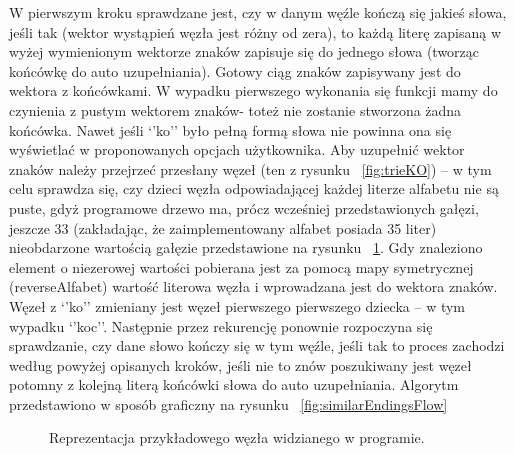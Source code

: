 \documentclass[twoside,a4paper]{book}
\begin{document}
W pierwszym kroku sprawdzane jest, czy w danym węźle kończą się  jakieś słowa, jeśli tak (wektor wystąpień węzła jest różny od zera), to każdą literę zapisaną w wyżej wymienionym wektorze znaków zapisuje się do jednego słowa (tworząc końcówkę do auto uzupełniania). Gotowy ciąg znaków zapisywany jest do wektora z końcówkami. W wypadku pierwszego wykonania się funkcji mamy do czynienia z pustym wektorem znaków- toteż nie zostanie stwo\-rzo\-na żadna końcówka. Nawet jeśli  ‘’ko’’ było pełną formą słowa nie powinna ona się wyświetlać w proponowanych opcjach użytkownika. Aby uzupełnić we\-ktor znaków należy przejrzeć przesłany węzeł (ten z rysunku ~\ref{fig:trieKO}) – w tym celu sprawdza się, czy dzieci węzła odpowiadającej każdej literze alfabetu nie są puste, gdyż programowe drzewo ma, prócz wcześniej przedstawionych gałęzi, jeszcze 33 (zakładając, że zaimplementowany alfabet posiada 35 liter) nieobdarzone wartością gałęzie przedstawione na rysunku ~\ref{fig:trieKOnull}. Gdy znaleziono element o niezerowej wartości pobierana jest za pomocą mapy symetrycznej (reverseAlfabet) wartość literowa węzła i wprowadzana jest do wektora znaków. Węzeł z ‘’ko’’ zmieniany jest węzeł pierwszego pierwszego dziecka – w tym wypadku ‘’koc’’. Następnie przez rekurencję ponownie rozpoczyna się sprawdzanie, czy dane słowo kończy się w tym węźle, jeśli tak to proces zachodzi według powyżej opisanych kroków, jeśli nie to znów poszukiwany jest węzeł potomny z kolejną literą końcówki słowa do auto uzupełniania. Algorytm przedstawiono w sposób graficzny na rysunku ~\ref{fig:similarEndingsFlow}
		\begin{figure}[!h]
		\centering
		\caption{Reprezentacja przykładowego węzła widzianego w programie. }
		\label{fig:trieKOnull}
		\end{figure}
\end{document}
